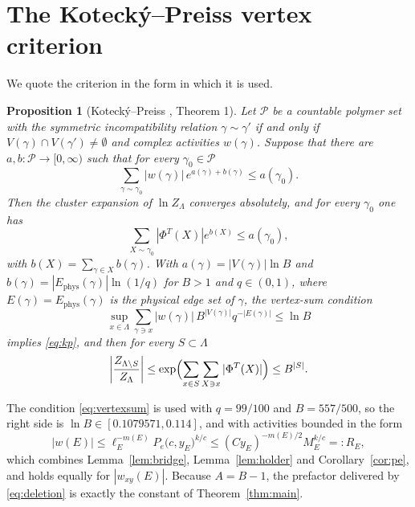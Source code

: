 \documentclass[11pt]{article}
\theoremstyle{plain}
\newtheorem{proposition}{Proposition}
\theoremstyle{definition}
\begin{document}
\section{The Koteck\'y--Preiss vertex criterion}\label{sec:kp}

We quote the criterion in the form in which it is used.

\begin{proposition}[Koteck\'y--Preiss \cite{kotecky1986}, Theorem 1]\label{prop:kp}
Let $\mathcal{P}$ be a countable polymer set with the symmetric incompatibility
relation $\gamma\sim\gamma'$ if and only if $V(\gamma)\cap V(\gamma')\ne\emptyset$ and
complex activities $w(\gamma)$. Suppose that there are
$a,b\colon\mathcal{P}\to[0,\infty)$ such that for every $\gamma_0\in\mathcal{P}$
\begin{equation}\label{eq:kp}
\sum_{\gamma\sim\gamma_0}|w(\gamma)|\,e^{a(\gamma)+b(\gamma)}\le a(\gamma_0).
\end{equation}
Then the cluster expansion of $\ln Z_\Lambda$ converges absolutely, and for every
$\gamma_0$ one has
\[
\sum_{X\sim\gamma_0}|\Phi^{T}(X)|e^{b(X)}\le a(\gamma_0),
\]
with $b(X)=\sum_{\gamma\in X}b(\gamma)$. With $a(\gamma)=|V(\gamma)|\ln B$ and
$b(\gamma)=|E_{\mathrm{phys}}(\gamma)|\ln(1/q)$ for $B>1$ and $q\in(0,1)$, where
$E(\gamma)=E_{\mathrm{phys}}(\gamma)$ is the physical edge set of $\gamma$, the
vertex-sum condition
\begin{equation}\label{eq:vertexsum}
\sup_{x\in\Lambda}\sum_{\gamma\ni x}|w(\gamma)|\,B^{|V(\gamma)|}q^{-|E(\gamma)|}
\le\ln B
\end{equation}
implies \eqref{eq:kp}, and then for every $S\subset\Lambda$
\begin{equation}\label{eq:deletion}
\left|\frac{Z_{\Lambda\setminus S}}{Z_\Lambda}\right|
\le\exp\Bigl(\sum_{x\in S}\sum_{X\ni x}|\Phi^{T}(X)|\Bigr)\le B^{|S|}.
\end{equation}
\end{proposition}

The condition \eqref{eq:vertexsum} is used with $q=99/100$ and $B=557/500$, so the
right side is $\ln B\in[0.1079571,0.114]$, and with activities bounded in the form
\begin{equation}\label{eq:activity}
|w(E)|\le\ell_E^{-m(E)}P_e\bigl(c,y_E\bigr)^{k/c}
\le(Cy_E)^{-m(E)/2}M_E^{k/c}=:R_E,
\end{equation}
which combines Lemma~\ref{lem:bridge}, Lemma~\ref{lem:holder} and
Corollary~\ref{cor:pe}, and holds equally for $|w_{xy}(E)|$. Because
$A=B-1$, the prefactor delivered by \eqref{eq:deletion} is exactly the constant of
Theorem~\ref{thm:main}.
\end{document}
